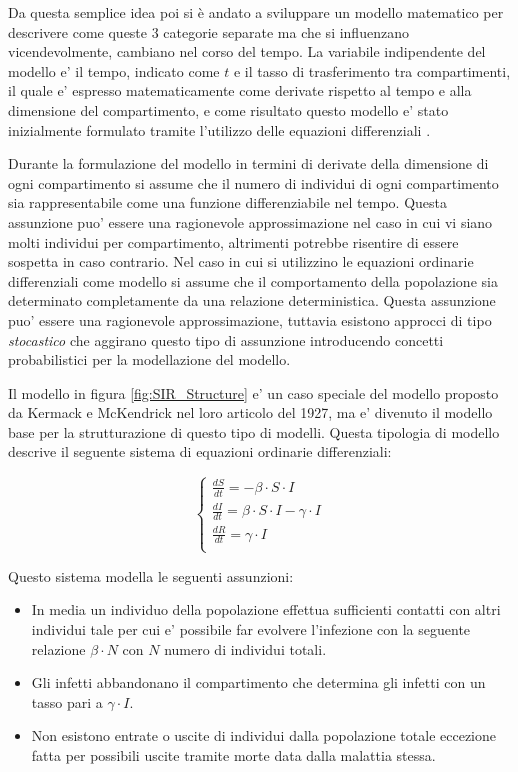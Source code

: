 Da questa semplice idea poi si è andato a sviluppare un modello
matematico per descrivere come queste 3 categorie separate ma 
che si influenzano vicendevolmente, cambiano nel corso del tempo.
La variabile indipendente del modello e' il tempo, indicato come $t$ e il 
tasso di trasferimento tra compartimenti, il quale e' espresso matematicamente come 
derivate rispetto al tempo e alla dimensione del compartimento, e come risultato questo 
modello e' stato inizialmente formulato tramite l'utilizzo delle equazioni differenziali
\cite{Brauer2008}. 

Durante la formulazione del modello in termini di derivate della dimensione di ogni compartimento
si assume che il numero di individui di ogni compartimento sia rappresentabile come una funzione 
differenziabile nel tempo. Questa assunzione puo' essere una ragionevole approssimazione nel caso 
in cui vi siano molti individui per compartimento, altrimenti potrebbe risentire di essere sospetta
in caso contrario. Nel caso in cui si utilizzino le equazioni ordinarie differenziali come modello 
si assume che il comportamento della popolazione sia determinato completamente da una relazione deterministica. 
Questa assunzione puo' essere una ragionevole approssimazione, tuttavia esistono approcci di tipo 
\emph{stocastico} che aggirano questo tipo di assunzione introducendo concetti probabilistici per
la modellazione del modello.

Il modello in figura \ref{fig:SIR_Structure} e' un caso speciale del modello proposto da Kermack e McKendrick 
nel loro articolo del 1927, ma e' divenuto il modello base per la strutturazione di questo tipo di modelli.
Questa tipologia di modello descrive il seguente sistema di equazioni ordinarie differenziali:

\[
    \left\{
    \begin{array}{ll}
        \frac{dS}{dt} = -\beta \cdot S \cdot I\\
        \frac{dI}{dt} = \beta \cdot S \cdot I - \gamma \cdot I\\
        \frac{dR}{dt} = \gamma \cdot I\\
    \end{array}
    \right.
\]

Questo sistema modella le seguenti assunzioni: 
\begin{itemize}
    \item In media un individuo della popolazione effettua sufficienti contatti con altri individui tale per cui 
    e' possibile far evolvere l'infezione con la seguente relazione $\beta \cdot N$ con $N$ numero di individui totali. 
    \item Gli infetti abbandonano il compartimento che determina gli infetti con un tasso pari a $\gamma \cdot I$.
    \item Non esistono entrate o uscite di individui dalla popolazione totale eccezione fatta per possibili uscite tramite morte
    data dalla malattia stessa.
\end{itemize}

